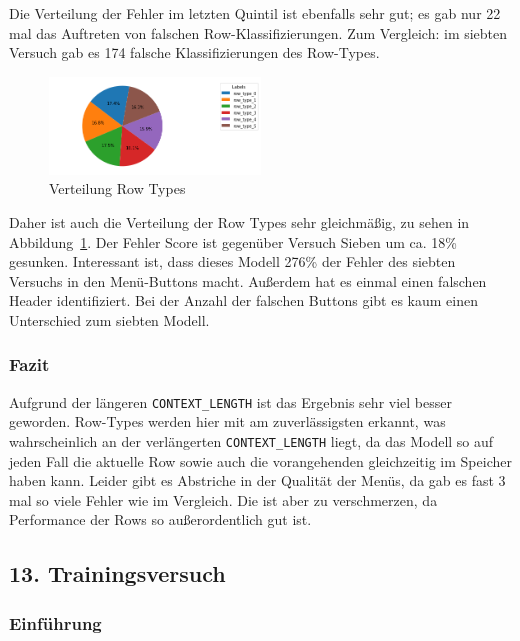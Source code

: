 \documentclass[pdftex,a4paper,halfparskip, article]{scrartcl}
\begin{document}
Die Verteilung der Fehler im letzten Quintil ist ebenfalls sehr gut; es gab nur 22 mal das Auftreten von falschen Row-Klassifizierungen. Zum Vergleich: im siebten Versuch gab es 174 falsche Klassifizierungen des Row-Types.

\begin{figure}[h]
\centering
\includegraphics[width=0.5\textwidth]{predictions_bin15_predicted_row_type_distribution}
\caption{Verteilung Row Types}
\label{fig:bin15_row_type}
\end{figure}

Daher ist auch die Verteilung der Row Types sehr gleichmäßig, zu sehen in Abbildung~\ref{fig:bin15_row_type}. 
Der Fehler Score ist gegenüber Versuch Sieben um ca. 18\% gesunken. 
Interessant ist, dass dieses Modell 276\% der Fehler des siebten Versuchs in den Menü-Buttons macht. Außerdem hat es einmal einen falschen Header identifiziert. Bei der Anzahl der falschen Buttons gibt es kaum einen Unterschied zum siebten Modell.

\subsubsection*{Fazit}
Aufgrund der längeren \texttt{CONTEXT\_LENGTH} ist das Ergebnis sehr viel besser geworden. Row-Types werden hier mit am zuverlässigsten erkannt, was wahrscheinlich an der verlängerten \texttt{CONTEXT\_LENGTH} liegt, da das Modell so auf jeden Fall die aktuelle Row sowie auch die vorangehenden gleichzeitig im Speicher haben kann. Leider gibt es Abstriche in der Qualität der Menüs, da gab es fast 3 mal so viele Fehler wie im Vergleich. Die ist aber zu verschmerzen, da Performance der Rows so außerordentlich gut ist. 

\subsection{13. Trainingsversuch}


\subsubsection*{Einführung}
\end{document}
